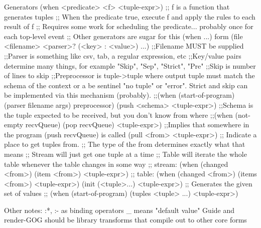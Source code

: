 Generators
(when <predicate> <f> <tuple-expr>)
   ;; f is a function that generates tuples
   ;; When the predicate true, execute f and apply the rules to each result of f
   ;; Requires some work for scheduling the predicate...
      probably once for each top-level event
   ;; Other generators are sugar for this (when ...) form
(file <filename> <parser>? (<key> : <value>) ...)
   ;;Filename MUST be supplied
   ;;Parser is something like csv, tab, a regular expression, etc
   ;;Key/value pairs determine many things, for example "Skip", "Sep", "Strict", "Pre"
   ;;Skip is number of lines to skip
   ;;Preprocessor is tuple->tuple where output tuple must match the schema
     of the context or a be sentinel "no tuple" or "error".
     Strict and skip can be implemented via this mechanism (probably).
   ;;(when (start-of-program) (parser filename args) preprocessor)
(push <schema> <tuple-expr>)
   ;;Schema is the tuple expected to be received, but you don't know from where
   ;;(when (not-empty recvQueue) (pop recvQueue) <tuple-expr>)
   ;;Implies that somewhere in the program (push recvQueue) is called
(pull <from> <tuple-expr>)
   ;; Indicate a place to get tuples from.  
   ;; The type of the from determines exactly what that means
   ;; Stream will just get one tuple at a time
   ;; Table will iterate the whole table whenever the table changes in some way
   ;; stream: (when (changed <from>) (item <from>) <tuple-expr>) 
   ;; table: (when (changed <from>)  (items <from>) <tuple-expr>) 
(init (<tuple>...) <tuple-expr>)
   ;; Generates the given set of values
   ;; (when (start-of-program) (tuples <tuple> ...) <tuple-expr>)


Other notes:
  :*, :- as binding operators
  _ means "default value"
  Guide and render-GOG should be library transforms that compile out to other core forms
